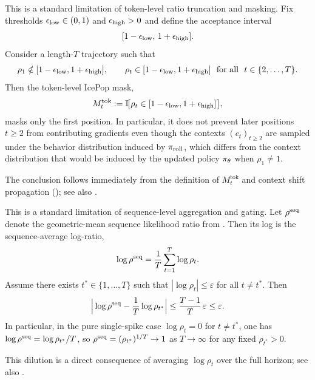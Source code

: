 \begin{remark}
\label{rem:token-is-fails}
This is a standard limitation of token-level ratio truncation and masking.
Fix thresholds $\epsilon_{\mathrm{low}}\in(0,1)$ and $\epsilon_{\mathrm{high}}>0$ and define the acceptance interval
\[
    [1-\epsilon_{\mathrm{low}},\,1+\epsilon_{\mathrm{high}}].
\]
Consider a length-$T$ trajectory such that
\begin{equation*}
    \rho_1 \notin [1-\epslow,1+\epshigh],
    \qquad
    \rho_t \in [1-\epslow,1+\epshigh]\ \text{ for all }\ t\in\{2,\ldots,T\}.
\end{equation*}
Then the token-level IcePop mask,
\begin{equation*}
    M_t^{\mathrm{tok}} := \mathbb{I}\!\big[\rho_t \in [1-\epsilon_{\mathrm{low}},1+\epsilon_{\mathrm{high}}]\big],
\end{equation*}
masks only the first position. In particular, it does not prevent later positions $t\ge 2$ from contributing gradients even though the
contexts $(c_t)_{t\ge2}$ are sampled under the behavior distribution induced by $\pi_{\mathrm{roll}}$, which differs from the context distribution that
would be induced by the updated policy $\pi_{\theta}$ when $\rho_1 \neq 1$.
\par
\noindent The conclusion follows immediately from the definition of $M_t^{\mathrm{tok}}$ and context shift propagation
(); see also \citet{li2025trm,yao2025offpolicy}.
\end{remark}

\begin{remark}
\label{rem:seq-is-fails}
This is a standard limitation of sequence-level aggregation and gating.
Let $\rho^{\mathrm{seq}}$ denote the geometric-mean sequence likelihood ratio from . Then its log is the sequence-average
log-ratio,
\begin{equation*}
    \log\rho^{\mathrm{seq}} = \frac{1}{T}\sum_{t=1}^T \log\rho_t.
\end{equation*}
Assume there exists $t^*\in\{1,\ldots,T\}$ such that $|\log\rho_t|\le \varepsilon$ for all $t\neq t^*$. Then
\begin{equation*}
    \Big|\log\rho^{\mathrm{seq}} - \frac{1}{T}\log\rho_{t^*}\Big| \le \frac{T-1}{T}\,\varepsilon \le \varepsilon.
\end{equation*}
In particular, in the pure single-spike case $\log\rho_t=0$ for $t\neq t^*$, one has $\log\rho^{\mathrm{seq}}=\log\rho_{t^*}/T$, so
$\rho^{\mathrm{seq}} = (\rho_{t^*})^{1/T}\to 1$ as $T\to\infty$ for any fixed $\rho_{t^*}>0$.
\par
\noindent This dilution is a direct consequence of averaging $\log\rho_t$ over the full horizon; see also \citet{gspo2025}.
\end{remark}

